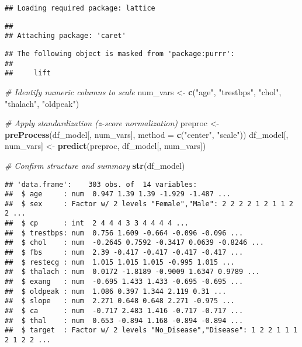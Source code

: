 \documentclass[
]{article}
\newenvironment{Shaded}{\begin{snugshade}}{\end{snugshade}}
\newcommand{\AttributeTok}[1]{\textcolor[rgb]{0.13,0.29,0.53}{#1}}
\newcommand{\CommentTok}[1]{\textcolor[rgb]{0.56,0.35,0.01}{\textit{#1}}}
\newcommand{\FunctionTok}[1]{\textcolor[rgb]{0.13,0.29,0.53}{\textbf{#1}}}
\newcommand{\NormalTok}[1]{#1}
\newcommand{\OtherTok}[1]{\textcolor[rgb]{0.56,0.35,0.01}{#1}}
\newcommand{\StringTok}[1]{\textcolor[rgb]{0.31,0.60,0.02}{#1}}
\begin{document}
\begin{verbatim}
## Loading required package: lattice
\end{verbatim}

\begin{verbatim}
## 
## Attaching package: 'caret'
\end{verbatim}

\begin{verbatim}
## The following object is masked from 'package:purrr':
## 
##     lift
\end{verbatim}

\begin{Shaded}
\begin{Highlighting}[]
\CommentTok{\# Identify numeric columns to scale}
\NormalTok{num\_vars }\OtherTok{\textless{}{-}} \FunctionTok{c}\NormalTok{(}\StringTok{"age"}\NormalTok{, }\StringTok{"trestbps"}\NormalTok{, }\StringTok{"chol"}\NormalTok{, }\StringTok{"thalach"}\NormalTok{, }\StringTok{"oldpeak"}\NormalTok{)}

\CommentTok{\# Apply standardization (z{-}score normalization)}
\NormalTok{preproc }\OtherTok{\textless{}{-}} \FunctionTok{preProcess}\NormalTok{(df\_model[, num\_vars], }\AttributeTok{method =} \FunctionTok{c}\NormalTok{(}\StringTok{"center"}\NormalTok{, }\StringTok{"scale"}\NormalTok{))}
\NormalTok{df\_model[, num\_vars] }\OtherTok{\textless{}{-}} \FunctionTok{predict}\NormalTok{(preproc, df\_model[, num\_vars])}

\CommentTok{\# Confirm structure and summary}
\FunctionTok{str}\NormalTok{(df\_model)}
\end{Highlighting}
\end{Shaded}

\begin{verbatim}
## 'data.frame':    303 obs. of  14 variables:
##  $ age     : num  0.947 1.39 1.39 -1.929 -1.487 ...
##  $ sex     : Factor w/ 2 levels "Female","Male": 2 2 2 2 1 2 1 1 2 2 ...
##  $ cp      : int  2 4 4 4 3 3 4 4 4 4 ...
##  $ trestbps: num  0.756 1.609 -0.664 -0.096 -0.096 ...
##  $ chol    : num  -0.2645 0.7592 -0.3417 0.0639 -0.8246 ...
##  $ fbs     : num  2.39 -0.417 -0.417 -0.417 -0.417 ...
##  $ restecg : num  1.015 1.015 1.015 -0.995 1.015 ...
##  $ thalach : num  0.0172 -1.8189 -0.9009 1.6347 0.9789 ...
##  $ exang   : num  -0.695 1.433 1.433 -0.695 -0.695 ...
##  $ oldpeak : num  1.086 0.397 1.344 2.119 0.31 ...
##  $ slope   : num  2.271 0.648 0.648 2.271 -0.975 ...
##  $ ca      : num  -0.717 2.483 1.416 -0.717 -0.717 ...
##  $ thal    : num  0.653 -0.894 1.168 -0.894 -0.894 ...
##  $ target  : Factor w/ 2 levels "No_Disease","Disease": 1 2 2 1 1 1 2 1 2 2 ...
\end{verbatim}
\end{document}
